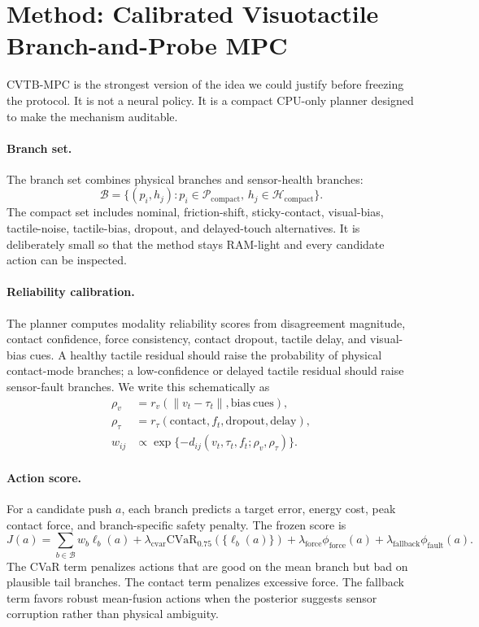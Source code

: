 \documentclass{article}
\newcommand{\method}{\textsc{CVTB-MPC}}
\newcommand{\act}{a}
\newcommand{\branchset}{\mathcal{B}}
\newcommand{\phys}{\mathcal{P}}
\newcommand{\health}{\mathcal{H}}
\begin{document}
\section{Method: Calibrated Visuotactile Branch-and-Probe MPC}

\method{} is the strongest version of the idea we could justify before freezing the protocol. It is not a neural policy. It is a compact CPU-only planner designed to make the mechanism auditable.

\paragraph{Branch set.}
The branch set combines physical branches and sensor-health branches:
\begin{equation}
  \branchset=\{(p_i,h_j):p_i\in\phys_{\mathrm{compact}},\, h_j\in\health_{\mathrm{compact}}\}.
\end{equation}
The compact set includes nominal, friction-shift, sticky-contact, visual-bias, tactile-noise, tactile-bias, dropout, and delayed-touch alternatives. It is deliberately small so that the method stays RAM-light and every candidate action can be inspected.

\paragraph{Reliability calibration.}
The planner computes modality reliability scores from disagreement magnitude, contact confidence, force consistency, contact dropout, tactile delay, and visual-bias cues. A healthy tactile residual should raise the probability of physical contact-mode branches; a low-confidence or delayed tactile residual should raise sensor-fault branches. We write this schematically as
\begin{align}
  \rho_v &= r_v(\|v_t-\tau_t\|, \mathrm{bias\ cues}),\\
  \rho_\tau &= r_\tau(\mathrm{contact}, f_t,\mathrm{dropout},\mathrm{delay}),\\
  w_{ij} &\propto \exp\{-d_{ij}(v_t,\tau_t,f_t;\rho_v,\rho_\tau)\}.
\end{align}

\paragraph{Action score.}
For a candidate push $\act$, each branch predicts a target error, energy cost, peak contact force, and branch-specific safety penalty. The frozen score is
\begin{equation}
  J(\act)=
  \sum_{b\in\branchset}w_b\ell_b(\act)
  +\lambda_{\mathrm{cvar}}\mathrm{CVaR}_{0.75}(\{\ell_b(\act)\})
  +\lambda_{\mathrm{force}}\phi_{\mathrm{force}}(\act)
  +\lambda_{\mathrm{fallback}}\phi_{\mathrm{fault}}(\act).
\end{equation}
The CVaR term penalizes actions that are good on the mean branch but bad on plausible tail branches. The contact term penalizes excessive force. The fallback term favors robust mean-fusion actions when the posterior suggests sensor corruption rather than physical ambiguity.
\end{document}
